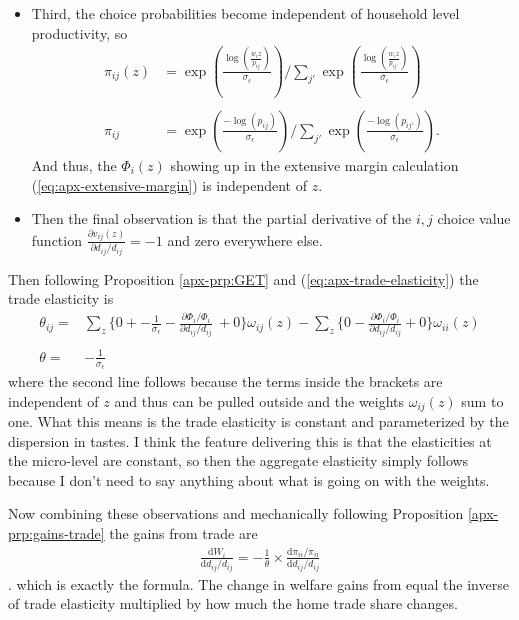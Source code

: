 \documentclass[12pt,pdftex]{article}
\begin{document}
\begin{onehalfspacing}
\begin{itemize}
\item Third, the choice probabilities become independent of household level productivity, so
\begin{align}
\nonumber \pi_{ij}(z) &= \exp \left( \frac{ \log\left( \frac{w_{i}z}{p_{ij}} \right) }{\sigma_{\epsilon}} \right) \Bigg / \sum_{j'} \exp \left( \frac{  \log\left( \frac{w_{i}z}{p_{ij'}} \right) }{\sigma_{\epsilon}} \right) \\
\nonumber \\
\nonumber \pi_{ij} &= \exp \left( \frac{ -\log\left( p_{ij} \right) }{\sigma_{\epsilon}} \right) \Bigg / \sum_{j'} \exp \left( \frac{  -\log\left( p_{ij'} \right) }{\sigma_{\epsilon}} \right).
\end{align}
And thus, the $\Phi_{i}(z)$ showing up in the extensive margin calculation (\ref{eq:apx-extensive-margin}) is independent of $z$.  

\item Then the final observation is that the partial derivative of the $i,j$ choice value function $\frac{\partial v_{ij}(z)}{\partial d_{ij}/d_{ij}} = -1$ and zero everywhere else. 
\end{itemize}
Then following Proposition \ref{apx-prp:GET} and (\ref{eq:apx-trade-elasticity}) the trade elasticity is
\begin{align}
\nonumber
\theta_{ij} =& \sum_{z} \bigg \{ 0 + -\frac{1}{\sigma_{\epsilon}} - \frac{\partial \Phi_{i} / \Phi_{i}}{\partial d_{ij}/d_{ij}} \ + 0 \bigg \}\omega_{ij}(z) - \sum_{z} \bigg \{  0 - \frac{\partial \Phi_{i} / \Phi_{i}}{\partial d_{ij}/d_{ij}} + 0 \bigg \}\omega_{ii}(z) \\
\nonumber \\
\theta =& -\frac{1}{\sigma_{\epsilon}} \nonumber
\end{align}
where the second line follows because the terms inside the brackets are independent of $z$ and thus can be pulled outside and the weights $\omega_{ij}(z)$ sum to one. What this means is the trade elasticity is constant and parameterized by the dispersion in tastes. I think the feature delivering this is that the elasticities at the micro-level are constant, so then the aggregate elasticity simply follows because I don't need to say anything about what is going on with the weights. 

Now combining these observations and mechanically following Proposition \ref{apx-prp:gains-trade} the gains from trade are
\begin{align}
\frac{\mathrm{d} W_{i}}{\mathrm{d} d_{ij} / d_{ij}} = -\frac{1}{\theta} \times \frac{\mathrm{d} \pi_{ii} / \pi_{ii}}{\mathrm{d}d_{ij} / d_{ij}}
\end{align}.
which is exactly the \citet{arkolakis2012new} formula. The change in welfare gains from equal the inverse of trade elasticity multiplied by how much the home trade share changes.


\end{onehalfspacing}
\end{document}
